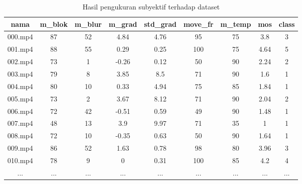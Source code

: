 \begin{table}[H]
	\fontsize{9pt}{9pt}\selectfont
	\centering
	\caption{Hasil pengukuran subyektif terhadap dataset}
	\label{overall-skor}
		\begin{tabular}{|c|c|c|c|c|c|c|c|c|}
			\hline
			\rowcolor[HTML]{EFEFEF} 
			nama    & m\_blok & m\_blur & m\_grad & std\_grad & move\_fr & m\_temp & mos  & class \\ \hline
			000.mp4 & 87      & 52      & 4.84    & 4.76      & 95          & 75          & 3.8  & 3     \\ \hline
			001.mp4 & 88      & 55      & 0.29    & 0.25      & 100         & 75          & 4.64 & 5     \\ \hline
			002.mp4 & 73      & 1       & -0.26   & 0.12      & 50          & 90          & 2.24 & 2     \\ \hline
			003.mp4 & 79      & 8       & 3.85    & 8.5       & 71          & 90          & 1.6  & 1     \\ \hline
			004.mp4 & 80      & 10      & 0.33    & 4.94      & 75          & 85          & 1.84 & 1     \\ \hline
			005.mp4 & 73      & 2       & 3.67    & 8.12      & 71          & 90          & 2.04 & 2     \\ \hline
			006.mp4 & 72      & 42      & -0.51   & 0.59      & 49          & 90          & 1.48 & 1     \\ \hline
			007.mp4 & 48      & 13      & 3.9     & 9.97      & 71          & 35          & 1    & 1     \\ \hline
			008.mp4 & 72      & 10      & -0.35   & 0.63      & 50          & 90          & 1.64 & 1     \\ \hline
			009.mp4 & 86      & 52      & 1.63    & 0.78      & 98          & 80          & 3.96 & 3     \\ \hline
			010.mp4 & 78      & 9       & 0       & 0.31      & 100         & 85          & 4.2  & 4     \\ \hline
			...	 & ...      & ...       & ...      & ...      & ...        & ...          & ...  & ...     \\ \hline

\end{tabular}
\end{table}
